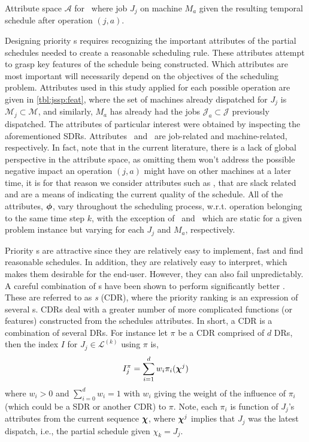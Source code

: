 \documentclass[smallextended]{svjour3}
\begin{document}
\begin{table}[t!] \centering
	\caption[Attribute space $\mathcal{A}$ for \JSP]{Attribute space 
	$\mathcal{A}$ for \JSP\ where job $J_j$ on machine $M_a$ given the 
	resulting temporal schedule after operation $(j,a)$.
	}
	\label{tbl:jssp:feat}
	{\setlength{\tabcolsep}{3pt} }
\end{table}

Designing priority \dr s requires recognizing the important 
attributes of the partial schedules needed to create a reasonable scheduling rule. 
These attributes attempt to grasp key features of the schedule being 
constructed. Which attributes are most important will necessarily depend on the
objectives of the scheduling problem. 
Attributes used in this study applied for 
each possible operation are given in \cref{tbl:jssp:feat}, where the set of 
machines already dispatched for $J_j$ is $\mathcal{M}_j\subset\mathcal{M}$, 
and similarly, $M_a$ has already had the jobs $\mathcal{J}_a\subset\mathcal{J}$ 
previously dispatched.
The attributes of particular interest were obtained by inspecting the 
aforementioned SDRs. Attributes \phiJobRelated\ and \phiMacRelated\ are 
job-related and machine-related, respectively.
In fact, \cite{Pickardt2013} note that in the current literature, there is a 
lack of global perspective in the attribute space, as omitting them won't 
address the possible negative impact an operation $(j,a)$ might have on other 
machines at a later time, it is for that reason we consider attributes such as 
\phiSlackRelated, that are slack related and are a means of indicating the 
current quality of the schedule.
All of the attributes, $\bm{\phi}$, vary throughout the scheduling process, 
w.r.t. operation belonging to the same time step $k$, with the exception of 
\phijobTotProcTime\ and \phimacTotProcTime\ which are static for a given 
problem instance but varying for each $J_j$ and $M_a$, respectively. 

Priority \dr s are attractive since they are relatively easy to 
implement, fast and find reasonable schedules. In addition, they are relatively 
easy to interpret, which makes them desirable for the end-user.
However, they can also fail unpredictably. 
A careful combination of \dr s have been shown to perform significantly better 
\cite{Jayamohan04}. These are referred to as \emph{\cdr s} 
(CDR), where the priority ranking is an expression of several \dr s. 
CDRs deal with a greater number of more complicated functions (or features) 
constructed from the schedules attributes. In short, a CDR is a combination of 
several DRs. 
For instance let $\pi$ be a CDR comprised of $d$ DRs, then the index $I$ for 
$J_j\in\mathcal{L}^{(k)}$ using $\pi$ is, 
\begin{equation}	I_j^{\pi} = \sum_{i=1}^d w_i \pi_i(\bm \chi^j) 
    \label{eq:CDR}
\end{equation}
where $w_i>0$ and $\sum_{i=0}^d w_i = 1$ with $w_i$ giving the weight of the 
influence of $\pi_i$ (which could be a SDR or another CDR) to $\pi$. Note, 
each $\pi_i$ is function of $J_j$'s attributes from the current sequence 
$\bm \chi$, where $\bm \chi^j$ implies that $J_j$ was the latest dispatch, i.e., the 
partial schedule given $\chi_k=J_j$.
\end{document}
